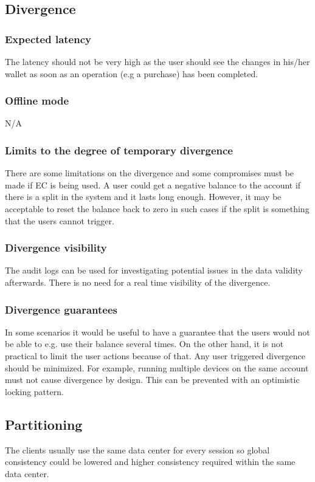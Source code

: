 \documentclass[11pt,a4paper]{report}
\begin{document}
\subsection{Divergence}
\subsubsection{Expected latency}
The latency should not be very high as the user should see the changes in his/her wallet as soon as an operation (e.g a purchase) has been completed.

\subsubsection{Offline mode}
N/A

\subsubsection{Limits to the degree of temporary divergence}
There are some limitations on the divergence and some compromises must be made if EC is being used. A user could get a negative balance to the account if there is a split in the system and it lasts long enough. However, it may be acceptable to reset the balance back to zero in such cases if the split is something that the users cannot trigger.

\subsubsection{Divergence visibility}
The audit logs can be used for investigating potential issues in the data validity afterwards. There is no need for a real time visibility of the divergence.

\subsubsection{Divergence guarantees}
In some scenarios it would be useful to have a guarantee that the users would not be able to e.g. use their balance several times. On the other hand, it is not practical to limit the user actions because of that.
Any user triggered divergence should be minimized. For example, running multiple devices on the same account must not cause divergence by design. This can be prevented with an optimistic locking pattern.

\subsection{Partitioning}
The clients usually use the same data center for every session so global consistency could be lowered and higher consistency required within the same data center.
\end{document}
